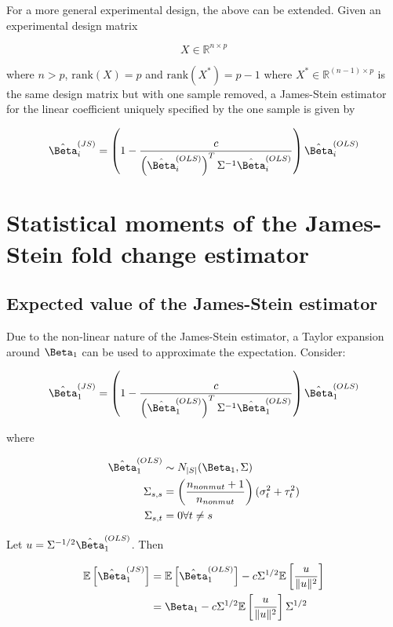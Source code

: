 For a more general experimental design, the above can be extended.
Given an experimental design matrix

\begin{equation*}
  X \in \mathbb{R}^{n \times p}
\end{equation*}

where $n > p$, $\text{rank}(X) = p$ and $\text{rank}(X^*) = p - 1$ where $X^* \in \mathbb{R}^{(n - 1) \times p}$ is the same design matrix but with one sample removed, a James-Stein estimator for the linear coefficient uniquely specified by the one sample is given by

\begin{equation*}
  \hat{\Beta}_i^{(JS)} = \left( 1 - \frac{c}{\left( \hat{\Beta}_i^{(OLS)} \right)^T \Sigma^{-1} \hat{\Beta}_i^{(OLS)}} \right) \hat{\Beta}_i^{(OLS)}
\end{equation*}

\section{Statistical moments of the James-Stein fold change estimator}

\subsection{Expected value of the James-Stein estimator}

Due to the non-linear nature of the James-Stein estimator, a Taylor expansion around $\Beta_1$ can be used to approximate the expectation.
Consider:

\begin{equation*}
  \hat{\Beta}_1^{(JS)} = \left( 1 - \frac{c}{\left( \hat{\Beta}_1^{(OLS)} \right)^T \Sigma^{-1} \hat{\Beta}_1^{(OLS)}} \right) \hat{\Beta}_1^{(OLS)}
\end{equation*}

where

\begin{align*}
  \hat{\Beta}_1^{(OLS)} &\sim N_{|S|}(\Beta_1, \Sigma) \\
  \Sigma_{s,s} &= \left( \frac{n_{nonmut} + 1}{n_{nonmut}} \right) (\sigma_t^2 + \tau_t^2) \\
  \Sigma_{s,t} &= 0 \forall t \ne s
\end{align*}

Let $u = \Sigma^{-1/2}\hat{\Beta}_1^{(OLS)}$.
Then

\begin{align*}
  \mathbb{E}\left[ \hat{\Beta}_1^{(JS)} \right] &= \mathbb{E} \left[ \hat{\Beta}_1^{(OLS)} \right] - c\Sigma^{1/2}\mathbb{E} \left[ \frac{u}{\Vert u \Vert ^2} \right] \\
  &= \Beta_1 - c\Sigma^{1/2}\mathbb{E} \left[ \frac{u}{\Vert u \Vert ^2} \right] \Sigma^{1/2}\\
\end{align*}

